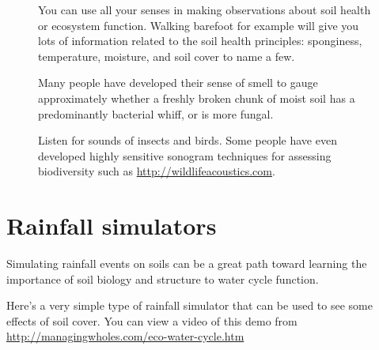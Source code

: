 \documentclass[11pt,letterpaper,twoside,onecolumn]{memoir}
\begin{document}
\begin{figure}
\begin{tcolorbox}
\setlength{\parskip}{.7em}
You can use all your senses in making observations about soil health or ecosystem function. Walking barefoot for example will give you lots of information related to the soil health principles: sponginess, temperature, moisture, and soil cover to name a few. 

Many people have developed their sense of smell to gauge approximately whether a freshly broken chunk of moist soil has a predominantly bacterial whiff, or is more fungal. 

Listen for sounds of insects and birds. Some people have even developed highly sensitive sonogram techniques for assessing biodiversity such as \url{http://wildlifeacoustics.com}.
\end{tcolorbox}
\end{figure}

\section*{Rainfall simulators}

Simulating rainfall events on soils can be a great path toward learning the importance of soil biology and structure to water cycle function.

Here's a very simple type of rainfall simulator that can be used to see some effects of soil cover. You can view a video of this demo from \url{http://managingwholes.com/eco-water-cycle.htm}
\end{document}
